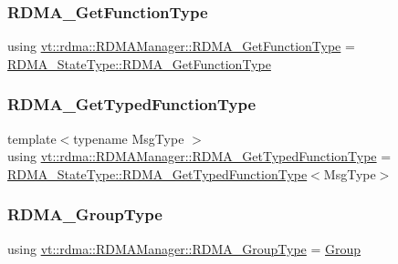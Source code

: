 \subsubsection{\texorpdfstring{R\+D\+M\+A\+\_\+\+Get\+Function\+Type}{RDMA\_GetFunctionType}}
{\footnotesize\ttfamily using \hyperlink{structvt_1_1rdma_1_1_r_d_m_a_manager_a77d00c37a45276b36ef64b9226a8ef0f}{vt\+::rdma\+::\+R\+D\+M\+A\+Manager\+::\+R\+D\+M\+A\+\_\+\+Get\+Function\+Type} =  \hyperlink{structvt_1_1rdma_1_1_state_af0baaa6ac5c3b7b256d032f2ee845676}{R\+D\+M\+A\+\_\+\+State\+Type\+::\+R\+D\+M\+A\+\_\+\+Get\+Function\+Type}}

\mbox{\label{structvt_1_1rdma_1_1_r_d_m_a_manager_a0d865535d118fe9dcab074fd3df74ce1}} 
\subsubsection{\texorpdfstring{R\+D\+M\+A\+\_\+\+Get\+Typed\+Function\+Type}{RDMA\_GetTypedFunctionType}}
{\footnotesize\ttfamily template$<$typename Msg\+Type $>$ \\
using \hyperlink{structvt_1_1rdma_1_1_r_d_m_a_manager_a0d865535d118fe9dcab074fd3df74ce1}{vt\+::rdma\+::\+R\+D\+M\+A\+Manager\+::\+R\+D\+M\+A\+\_\+\+Get\+Typed\+Function\+Type} =  \hyperlink{structvt_1_1rdma_1_1_state_a95b006a568982435e63aa18feb5fc202}{R\+D\+M\+A\+\_\+\+State\+Type\+::\+R\+D\+M\+A\+\_\+\+Get\+Typed\+Function\+Type}$<$Msg\+Type$>$}

\mbox{\label{structvt_1_1rdma_1_1_r_d_m_a_manager_a578dd586d6982be7476b4df7656cd024}} 
\subsubsection{\texorpdfstring{R\+D\+M\+A\+\_\+\+Group\+Type}{RDMA\_GroupType}}
{\footnotesize\ttfamily using \hyperlink{structvt_1_1rdma_1_1_r_d_m_a_manager_a578dd586d6982be7476b4df7656cd024}{vt\+::rdma\+::\+R\+D\+M\+A\+Manager\+::\+R\+D\+M\+A\+\_\+\+Group\+Type} =  \hyperlink{structvt_1_1rdma_1_1_group}{Group}}

